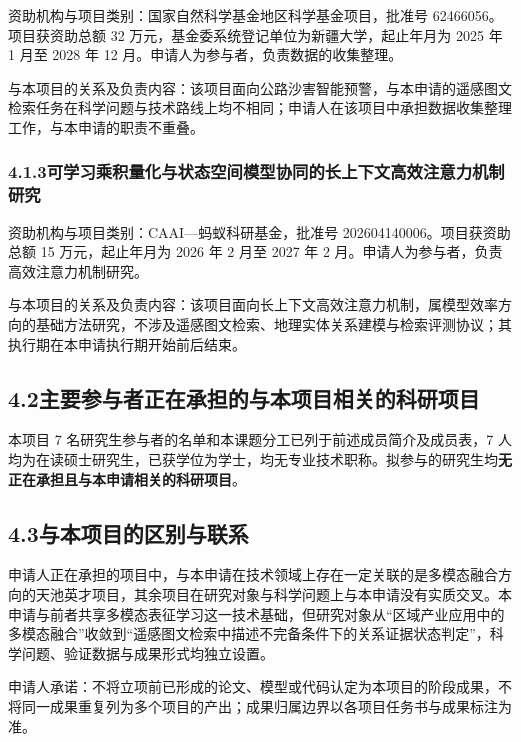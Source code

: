 资助机构与项目类别：国家自然科学基金地区科学基金项目，批准号 62466056。项目获资助总额 32 万元，基金委系统登记单位为新疆大学，起止年月为 2025 年 1 月至 2028 年 12 月。申请人为参与者，负责数据的收集整理。

与本项目的关系及负责内容：该项目面向公路沙害智能预警，与本申请的遥感图文检索任务在科学问题与技术路线上均不相同；申请人在该项目中承担数据收集整理工作，与本申请的职责不重叠。

\subsubsection*{4.1.3\quad 可学习乘积量化与状态空间模型协同的长上下文高效注意力机制研究}

资助机构与项目类别：CAAI---蚂蚁科研基金，批准号 202604140006。项目获资助总额 15 万元，起止年月为 2026 年 2 月至 2027 年 2 月。申请人为参与者，负责高效注意力机制研究。

与本项目的关系及负责内容：该项目面向长上下文高效注意力机制，属模型效率方向的基础方法研究，不涉及遥感图文检索、地理实体关系建模与检索评测协议；其执行期在本申请执行期开始前后结束。

\subsection*{4.2\quad 主要参与者正在承担的与本项目相关的科研项目}

本项目 7 名研究生参与者的名单和本课题分工已列于前述成员简介及成员表，7 人均为在读硕士研究生，已获学位为学士，均无专业技术职称。拟参与的研究生均\textbf{无正在承担且与本申请相关的科研项目}。

\subsection*{4.3\quad 与本项目的区别与联系}

申请人正在承担的项目中，与本申请在技术领域上存在一定关联的是多模态融合方向的天池英才项目，其余项目在研究对象与科学问题上与本申请没有实质交叉。本申请与前者共享多模态表征学习这一技术基础，但研究对象从“区域产业应用中的多模态融合”收敛到“遥感图文检索中描述不完备条件下的关系证据状态判定”，科学问题、验证数据与成果形式均独立设置。

申请人承诺：不将立项前已形成的论文、模型或代码认定为本项目的阶段成果，不将同一成果重复列为多个项目的产出；成果归属边界以各项目任务书与成果标注为准。
